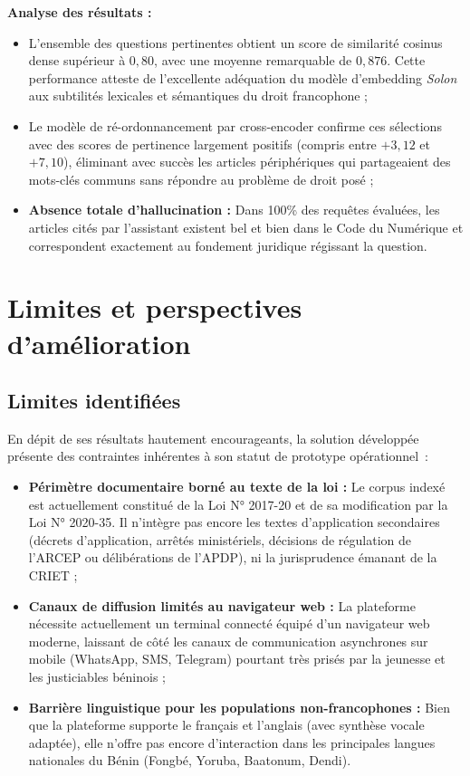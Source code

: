 \noindent\textbf{Analyse des résultats :}
\begin{itemize}
    \item L'ensemble des questions pertinentes obtient un score de similarité cosinus dense supérieur à $0{,}80$, avec une moyenne remarquable de $0{,}876$. Cette performance atteste de l'excellente adéquation du modèle d'embedding \textit{Solon} aux subtilités lexicales et sémantiques du droit francophone ;
    \item Le modèle de ré-ordonnancement par cross-encoder confirme ces sélections avec des scores de pertinence largement positifs (compris entre $+3{,}12$ et $+7{,}10$), éliminant avec succès les articles périphériques qui partageaient des mots-clés communs sans répondre au problème de droit posé ;
    \item \textbf{Absence totale d'hallucination :} Dans 100\% des requêtes évaluées, les articles cités par l'assistant existent bel et bien dans le Code du Numérique et correspondent exactement au fondement juridique régissant la question.
\end{itemize}

\section{Limites et perspectives d'amélioration}

\subsection{Limites identifiées}

En dépit de ses résultats hautement encourageants, la solution développée présente des contraintes inhérentes à son statut de prototype opérationnel~:

\begin{itemize}
    \item \textbf{Périmètre documentaire borné au texte de la loi :} Le corpus indexé est actuellement constitué de la Loi N° 2017-20 et de sa modification par la Loi N° 2020-35. Il n'intègre pas encore les textes d'application secondaires (décrets d'application, arrêtés ministériels, décisions de régulation de l'ARCEP ou délibérations de l'APDP), ni la jurisprudence émanant de la CRIET ;
    
    \item \textbf{Canaux de diffusion limités au navigateur web :} La plateforme nécessite actuellement un terminal connecté équipé d'un navigateur web moderne, laissant de côté les canaux de communication asynchrones sur mobile (WhatsApp, SMS, Telegram) pourtant très prisés par la jeunesse et les justiciables béninois ;
    
    \item \textbf{Barrière linguistique pour les populations non-francophones :} Bien que la plateforme supporte le français et l'anglais (avec synthèse vocale adaptée), elle n'offre pas encore d'interaction dans les principales langues nationales du Bénin (Fongbé, Yoruba, Baatonum, Dendi).
\end{itemize}

